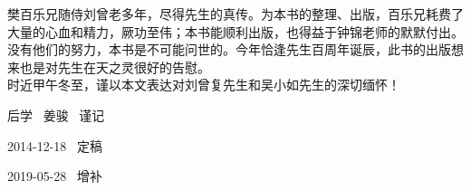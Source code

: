 {\textrm{樊百乐兄随侍刘曾老多年，尽得先生的真传。为本书的整理、出版，百乐兄耗费了大量的心血和精力，厥功至伟；本书能顺利出版，也得益于钟锦老师的默默付出。没有他们的努力，本书是不可能问世的。今年恰逢先生百周年诞辰，此书的出版想来也是对先生在天之灵很好的告慰。}\\

\textrm{时近甲午冬至，谨以本文表达对刘曾复先生和吴小如先生的深切缅怀！}

\begin{flushright}
\textrm{后学~ 姜骏~ 谨记~~}

\textrm{2014-12-18~ 定稿~~}

\textrm{2019-05-28~ 增补~~~}
\end{flushright}
}
